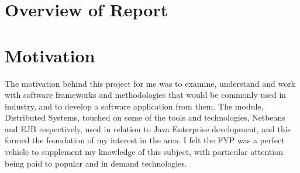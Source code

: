 \section{Overview of Report}



\section{Motivation}

The motivation behind this project for me was to examine, understand and work with software frameworks and methodologies that would be commonly used in industry, and to develop a software application from them. The module, Distributed Systems, touched on some of the tools and technologies, Netbeans and EJB respectively, used in relation to Java Enterprise development, and this formed the foundation of my interest in the area. I felt the FYP was a perfect vehicle to supplement my knowledge of this subject, with particular attention being paid to popular and in demand technologies. 


